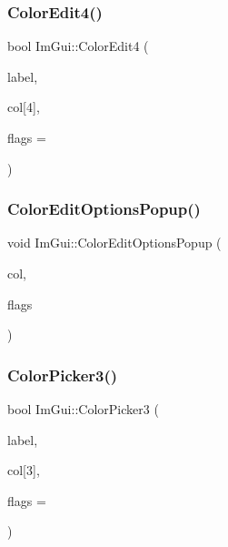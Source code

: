 \hypertarget{namespace_im_gui_ac3f45e2aa0b1d591cc8a2cdf8b566a45}{}\label{namespace_im_gui_ac3f45e2aa0b1d591cc8a2cdf8b566a45} 
\subsubsection{\texorpdfstring{Color\+Edit4()}{ColorEdit4()}}
{\footnotesize\ttfamily bool Im\+Gui\+::\+Color\+Edit4 (\begin{DoxyParamCaption}\item[{const char $\ast$}]{label,  }\item[{float}]{col\mbox{[}4\mbox{]},  }\item[{Im\+Gui\+Color\+Edit\+Flags}]{flags = {} }\end{DoxyParamCaption})}

\hypertarget{namespace_im_gui_a6bfb117816d669f8704e5d0c0c0795fe}{}\label{namespace_im_gui_a6bfb117816d669f8704e5d0c0c0795fe} 
\subsubsection{\texorpdfstring{Color\+Edit\+Options\+Popup()}{ColorEditOptionsPopup()}}
{\footnotesize\ttfamily void Im\+Gui\+::\+Color\+Edit\+Options\+Popup (\begin{DoxyParamCaption}\item[{const float $\ast$}]{col,  }\item[{Im\+Gui\+Color\+Edit\+Flags}]{flags }\end{DoxyParamCaption})}

\hypertarget{namespace_im_gui_a2a2a98cb9a17b18702be6b954670b388}{}\label{namespace_im_gui_a2a2a98cb9a17b18702be6b954670b388} 
\subsubsection{\texorpdfstring{Color\+Picker3()}{ColorPicker3()}}
{\footnotesize\ttfamily bool Im\+Gui\+::\+Color\+Picker3 (\begin{DoxyParamCaption}\item[{const char $\ast$}]{label,  }\item[{float}]{col\mbox{[}3\mbox{]},  }\item[{Im\+Gui\+Color\+Edit\+Flags}]{flags = {} }\end{DoxyParamCaption})}

